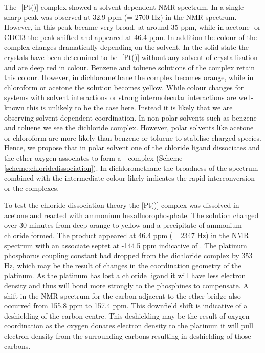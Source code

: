 The \trans-[Pt(\tButhixantphos)] complex showed a solvent dependent NMR spectrum.  In  a single sharp peak was observed at 32.9 ppm (\JPtP = 2700 Hz) in the \phosphorus{} NMR spectrum.  However, in  this peak became very broad, at around 35 ppm, while in acetone-  or CDCl3 the peak shifted and appeared at 46.4 ppm.  In addition the colour of the complex changes dramatically depending on the solvent.  In the solid state the crystals have been determined to be \trans{}-[Pt(\tButhixantphos)] without any solvent of crystallisation and are deep red in colour.  Benzene and toluene solutions of the complex retain this colour.  However, in dichloromethane the complex becomes orange, while in chloroform or acetone the solution becomes yellow.  While colour changes for systems with solvent interactions or strong intermolecular interactions are well-known this is unlikely to be the case here.  Instead it is likely that we are observing solvent-dependent coordination.  In non-polar solvents such as benzene and toluene we see the dichloride complex.  However, polar solvents like acetone or chloroform are more likely than benzene or toluene to stabilise charged species.  Hence, we propose that in polar solvent one of the chloride ligand dissociates and the ether oxygen associates to form a \POP-\tButhixantphos{} complex (Scheme \ref{scheme:chloridedissociation}).  In dichloromethane the broadness of the spectrum combined with the intermediate colour likely indicates the rapid interconversion or the complexes.  

To test the chloride dissociation theory the [Pt(\tButhixantphos)] complex was dissolved in acetone and reacted with ammonium hexafluorophosphate.  The solution changed over 30 minutes from deep orange to yellow and a precipitate of ammonium chloride formed.  The product appeared at 46.4 ppm (\JPtP = 2347 Hz) in the \phosphorus{} NMR spectrum with an associate septet at -144.5 ppm indicative of .  The platinum phosphorus coupling constant had dropped from the dichloride complex by 353 Hz, which may be the result of changes in the coordination geometry of the platinum.  As the platinum has lost a chloride ligand it will have less electron density and thus will bond more strongly to the phosphines to compensate.  A shift in the \carbon{} NMR spectrum for the carbon adjacent to the ether bridge also occurred from 155.8 ppm to 157.4 ppm.  This downfield  shift is indicative of a deshielding of the carbon centre.  This deshielding may be the result of oxygen coordination as the oxygen donates electron density to the platinum it will pull electron density from the surrounding carbons resulting in deshielding of those carbons.

